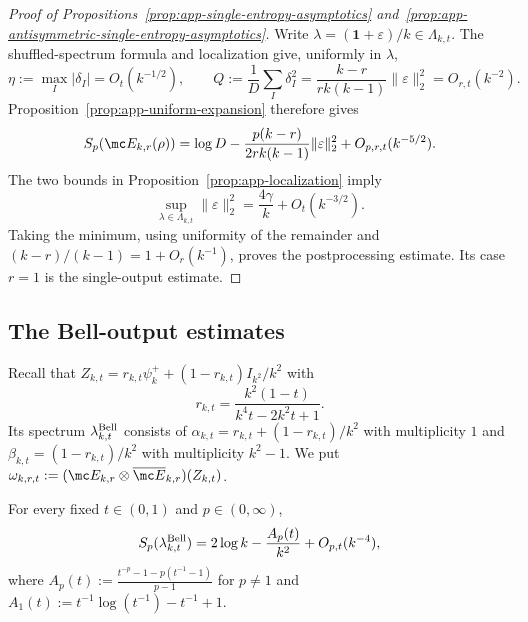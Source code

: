\begin{proof}[Proof of Propositions~\ref{prop:app-single-entropy-asymptotics}
and~\ref{prop:app-antisymmetric-single-entropy-asymptotics}]
Write \(\lambda=(\mathbf1+\varepsilon)/k\in\Lambda_{k,t}\).
The shuffled-spectrum formula and localization give, uniformly in
\(\lambda\),
\begin{equation}
    \eta:=\max_I|\delta_I|=O_t(k^{-1/2}),\qquad
    Q:=\frac1D\sum_I\delta_I^2
       =\frac{k-r}{rk(k-1)}\|\varepsilon\|_2^2
       =O_{r,t}(k^{-2}).
\end{equation}
Proposition~\ref{prop:app-uniform-expansion} therefore gives
\begin{equation}
    S_p\!\left(\mc E_{k,r}(\rho)\right)
    =\log D-\frac{p(k-r)}{2rk(k-1)}\|\varepsilon\|_2^2
       +O_{p,r,t}(k^{-5/2}).
\end{equation}
The two bounds in Proposition~\ref{prop:app-localization} imply
\begin{equation}
    \sup_{\lambda\in\Lambda_{k,t}}\|\varepsilon\|_2^2
       =\frac{4\gamma}k+O_t(k^{-3/2}).
\end{equation}
Taking the minimum, using uniformity of the remainder and
\((k-r)/(k-1)=1+O_r(k^{-1})\), proves the postprocessing estimate.
Its case \(r=1\) is the single-output estimate.
\end{proof}
 
\subsection{The Bell-output estimates}
 
Recall that \(Z_{k,t}=r_{k,t}\psi_k^++(1-r_{k,t})I_{k^2}/k^2\) with
\begin{equation}
    r_{k,t}=\frac{k^2(1-t)}{k^4t-2k^2t+1}.
    \label{eq:app-rkt}
\end{equation}
Its spectrum \(\lambda^{\rm Bell}_{k,t}\) consists of
\(\alpha_{k,t}=r_{k,t}+(1-r_{k,t})/k^2\) with multiplicity \(1\) and
\(\beta_{k,t}=(1-r_{k,t})/k^2\) with multiplicity \(k^2-1\).  We put
\(\omega_{k,r,t}:=(\mc E_{k,r}\otimes\overline{\mc E}_{k,r})(Z_{k,t})\).
 
\begin{proposition}
\label{prop:app-bell-entropy-asymptotics}
For every fixed \(t\in(0,1)\) and \(p\in(0,\infty)\),
\begin{equation}
    S_p(\lambda^{\rm Bell}_{k,t})
    =2\log k-\frac{A_p(t)}{k^2}+O_{p,t}(k^{-4}),
    \label{eq:app-bell-entropy-asymptotics}
\end{equation}
where \(A_p(t):=\frac{t^{-p}-1-p(t^{-1}-1)}{p-1}\) for \(p\neq1\) and
\(A_1(t):=t^{-1}\log(t^{-1})-t^{-1}+1\).
\end{proposition}
 
